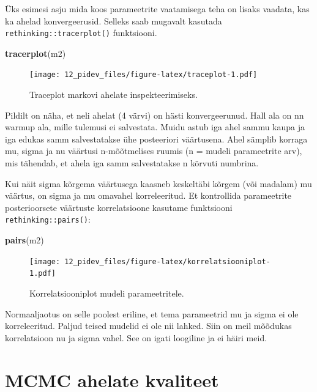 \documentclass[]{book}
\newenvironment{Shaded}{\begin{snugshade}}{\end{snugshade}}
\newcommand{\KeywordTok}[1]{\textcolor[rgb]{0.13,0.29,0.53}{\textbf{#1}}}
\newcommand{\NormalTok}[1]{#1}
\begin{document}
Üks esimesi asju mida koos parameetrite vaatamisega teha on lisaks vaadata, kas ka ahelad konvergeerusid.
Selleks saab mugavalt kasutada \texttt{rethinking::tracerplot()} funktsiooni.



\begin{Shaded}
\begin{Highlighting}[]
\KeywordTok{tracerplot}\NormalTok{(m2)}
\end{Highlighting}
\end{Shaded}

\begin{figure}
\centering
\texttt{[image: 12\_pidev\_files/figure-latex/traceplot-1.pdf]}
\caption{\label{fig:traceplot}Traceplot markovi ahelate inspekteerimiseks.}
\end{figure}

Pildilt on näha, et neli ahelat (4 värvi) on hästi konvergeerunud. Hall ala on nn warmup ala, mille tulemusi ei salvestata. Muidu astub iga ahel sammu kaupa ja iga edukas samm salvestatakse ühe posteeriori väärtusena. Ahel sämplib korraga mu, sigma ja nu väärtusi n-mõõtmelises ruumis (n = mudeli parameetrite arv), mis tähendab, et ahela iga samm salvestatakse n kõrvuti numbrina.

Kui näit sigma kõrgema väärtusega kaasneb keskeltäbi kõrgem (või madalam) mu väärtus, on sigma ja mu omavahel korreleeritud.
Et kontrollida parameetrite posterioorsete väärtuste korrelatsioone kasutame funktsiooni \texttt{rethinking::pairs()}:



\begin{Shaded}
\begin{Highlighting}[]
\KeywordTok{pairs}\NormalTok{(m2)}
\end{Highlighting}
\end{Shaded}

\begin{figure}
\centering
\texttt{[image: 12\_pidev\_files/figure-latex/korrelatsiooniplot-1.pdf]}
\caption{\label{fig:korrelatsiooniplot}Korrelatsiooniplot mudeli parameetritele.}
\end{figure}

Normaaljaotus on selle poolest eriline, et tema parameetrid mu ja sigma ei ole korreleeritud.
Paljud teised mudelid ei ole nii lahked.
Siin on meil mõõdukas korrelatsioon nu ja sigma vahel.
See on igati loogiline ja ei häiri meid.

\hypertarget{mcmc-ahelate-kvaliteet}{%
\section*{MCMC ahelate kvaliteet}\label{mcmc-ahelate-kvaliteet}}
\end{document}
